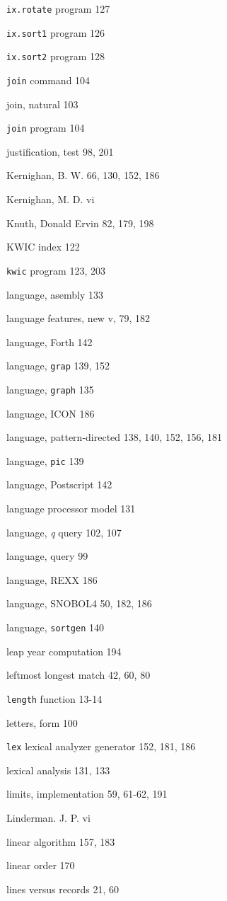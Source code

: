 \begin{multicols}{2}
\verb'ix.rotate' program 127 

\verb'ix.sort1' program 126

\verb'ix.sort2' program 128 

\verb'join' command 104

join, natural 103

\verb'join' program 104

justification, test 98, 201

Kernighan, B. W. 66, 130, 152, 186

Kernighan, M. D. vi 

Knuth, Donald Ervin 82, 179, 198

KWIC index 122

\verb'kwic' program 123, 203

language, asembly 133

language features, new v, 79, 182

language, Forth 142

language, \verb'grap' 139, 152

language, \verb'graph' 135

language, ICON 186

language, pattern-directed 138, 140, 152, 156, 181

language, \verb'pic' 139

language, Postscript 142

language processor model 131

language, \textit{q} query 102, 107

language, query 99

language, REXX 186

language, SNOBOL4 50, 182, 186

language, \verb'sortgen' 140

leap year computation 194

leftmost longest match 42, 60, 80

\verb'length' function 13-14

letters, form 100

\verb'lex' lexical analyzer generator 152, 181, 186

lexical analysis 131, 133

limits, implementation 59, 61-62, 191

Linderman. J. P. vi

linear algorithm 157, 183

linear order 170

lines versus records 21, 60


\end{multicols}
